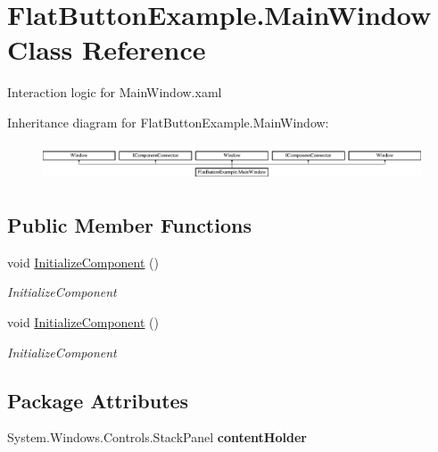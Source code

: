 \hypertarget{class_flat_button_example_1_1_main_window}{}\section{Flat\+Button\+Example.\+Main\+Window Class Reference}
\label{class_flat_button_example_1_1_main_window}


Interaction logic for Main\+Window.\+xaml  


Inheritance diagram for Flat\+Button\+Example.\+Main\+Window\+:\begin{figure}[H]
\begin{center}
\leavevmode
\includegraphics[height=1.125628cm]{d6/d2d/class_flat_button_example_1_1_main_window}
\end{center}
\end{figure}
\subsection*{Public Member Functions}
\begin{DoxyCompactItemize}
\item 
void \mbox{\hyperlink{class_flat_button_example_1_1_main_window_a1654b57dd9f691e969927f13abcecc4f}{Initialize\+Component}} ()
\begin{DoxyCompactList}\small\item\em Initialize\+Component \end{DoxyCompactList}\item 
void \mbox{\hyperlink{class_flat_button_example_1_1_main_window_a1654b57dd9f691e969927f13abcecc4f}{Initialize\+Component}} ()
\begin{DoxyCompactList}\small\item\em Initialize\+Component \end{DoxyCompactList}\end{DoxyCompactItemize}
\subsection*{Package Attributes}
\begin{DoxyCompactItemize}
\item 
\mbox{\label{class_flat_button_example_1_1_main_window_accd5b0fb76f2e3d7d5c0ed11556c7463}} 
System.\+Windows.\+Controls.\+Stack\+Panel {\bfseries content\+Holder}
\end{DoxyCompactItemize}
